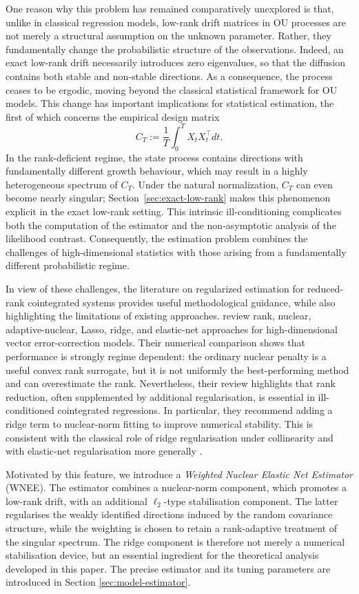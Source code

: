 \documentclass[11pt]{article}
\begin{document}
One reason why this problem has remained comparatively unexplored  is that, unlike in classical regression models, low-rank drift matrices in OU processes are not merely a structural assumption on the unknown parameter. Rather, they fundamentally change the probabilistic structure of the observations. Indeed, an exact low-rank drift necessarily introduces zero eigenvalues, so that the diffusion contains both stable and non-stable directions. As a consequence, the process ceases to be ergodic, moving  beyond the classical statistical framework for OU models. This change has important implications for statistical estimation, the first of which concerns the empirical design matrix
\[
C_T:=\frac{1}{T}\int_0^T X_tX_t^{\top}dt.
\]
 In the rank-deficient regime, the state process contains directions with fundamentally different growth behaviour, which may result in a highly heterogeneous spectrum of $C_T$. Under the natural normalization, $C_T$ can even become nearly singular; Section~\ref{sec:exact-low-rank} makes this phenomenon explicit in the exact low-rank setting. This intrinsic ill-conditioning complicates both the computation of the estimator and the non-asymptotic analysis of the likelihood contrast. Consequently, the estimation problem combines the challenges of high-dimensional statistics with those arising from a fundamentally different probabilistic regime.


In view of these challenges, the literature on regularized estimation for reduced-rank cointegrated systems provides useful methodological guidance, while also highlighting the limitations of existing approaches.  \citet{LevakovaDitlevsen2024} review rank, nuclear, adaptive-nuclear, Lasso, ridge, and elastic-net approaches for high-dimensional vector error-correction models.  Their numerical comparison shows that performance is strongly regime dependent: the ordinary nuclear penalty is a useful convex rank surrogate, but it is not uniformly the best-performing method and can overestimate the rank.  Nevertheless, their review highlights that rank reduction, often supplemented by additional regularisation, is essential in ill-conditioned cointegrated regressions.  In particular, they recommend adding a ridge term to nuclear-norm fitting to improve numerical stability.  This is consistent with the classical role of ridge regularisation under collinearity \citep{HoerlKennard1970} and with elastic-net regularisation more generally \citep{ZouHastie2005,MukherjeeZhu2011}.

Motivated by this feature, we introduce a \emph{Weighted Nuclear Elastic Net Estimator} (WNEE).  The estimator combines a nuclear-norm component, which promotes a low-rank drift, with an additional $\ell_2$-type stabilisation component.  The latter regularises the weakly identified directions induced by the random covariance structure, while the weighting is chosen to retain a rank-adaptive treatment of the singular spectrum. The ridge component is therefore not merely a numerical stabilisation device, but an essential ingredient for the theoretical analysis developed in this paper. The precise estimator and its tuning parameters are introduced in Section \ref{sec:model-estimator}.
\end{document}
